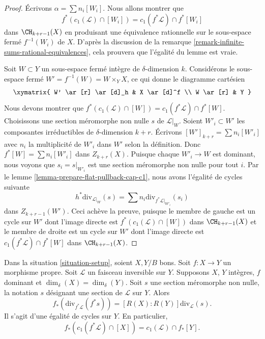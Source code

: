 \begin{proof}
Écrivons $\alpha = \sum n_i[W_i]$. Nous allons montrer que
$$
f^*(c_1(\mathcal{L}) \cap [W_i]) = c_1(f^*\mathcal{L}) \cap f^*[W_i]
$$
dans $\CH_{k + r - 1}(X)$ en produisant une équivalence rationnelle sur le
sous-espace fermé $f^{-1}(W_i)$ de $X$. D'après la discussion de la remarque
\ref{remark-infinite-sums-rational-equivalences}, cela prouvera que l'égalité
du lemme est vraie.

\medskip\noindent
Soit $W \subset Y$ un sous-espace fermé intègre de $\delta$-dimension $k$.
Considérons le sous-espace fermé $W' = f^{-1}(W) = W \times_Y X$, ce qui donne
le diagramme cartésien
$$
\xymatrix{
W' \ar[r] \ar[d]_h & X \ar[d]^f \\
W \ar[r] & Y
}
$$
Nous devons montrer que $f^*(c_1(\mathcal{L}) \cap [W]) = c_1(f^*\mathcal{L})
\cap f^*[W]$. Choisissons une section méromorphe non nulle $s$ de
$\mathcal{L}|_W$. Soient $W'_i \subset W'$ les composantes irréductibles de
$\delta$-dimension $k + r$. Écrivons $[W']_{k + r} = \sum n_i[W'_i]$ avec $n_i$
la multiplicité de $W'_i$ dans $W'$ selon la définition. Donc $f^*[W] = \sum
n_i[W'_i]$ dans $Z_{k + r}(X)$. Puisque chaque $W'_i \to W$ est dominant, nous
voyons que $s_i = s|_{W'_i}$ est une section méromorphe non nulle pour tout
$i$. Par le lemme \ref{lemma-prepare-flat-pullback-cap-c1}, nous avons
l'égalité de cycles suivante
$$
h^*\text{div}_{\mathcal{L}|_W}(s) =
\sum n_i\text{div}_{f^*\mathcal{L}|_{W'_i}}(s_i)
$$
dans $Z_{k + r - 1}(W')$. Ceci achève la preuve, puisque le membre de gauche est un
cycle sur $W'$ dont l'image directe est $f^*(c_1(\mathcal{L}) \cap [W])$ dans $\CH_{k +
r - 1}(X)$ et le membre de droite est un cycle sur $W'$ dont l'image directe est
$c_1(f^*\mathcal{L}) \cap f^*[W]$ dans $\CH_{k + r - 1}(X)$.
\end{proof}

\begin{lemma}
\label{lemma-equal-c1-as-cycles}
Dans la situation \ref{situation-setup}, soient $X, Y/B$ bons. Soit $f :
X \to Y$ un morphisme propre. Soit $\mathcal{L}$ un faisceau inversible sur $Y$.
Supposons $X$, $Y$ intègres, $f$ dominant et $\dim_\delta(X) =
\dim_\delta(Y)$. Soit $s$ une section méromorphe non nulle, la notation $s$ désignant une section de
$\mathcal{L}$ sur $Y$. Alors
$$
f_*\left(\text{div}_{f^*\mathcal{L}}(f^*s)\right) =
[R(X) : R(Y)]\text{div}_\mathcal{L}(s).
$$
Il s'agit d'une égalité de cycles sur $Y$. En particulier,
$$
f_*(c_1(f^*\mathcal{L}) \cap [X]) = c_1(\mathcal{L}) \cap f_*[Y].
$$
\end{lemma}


